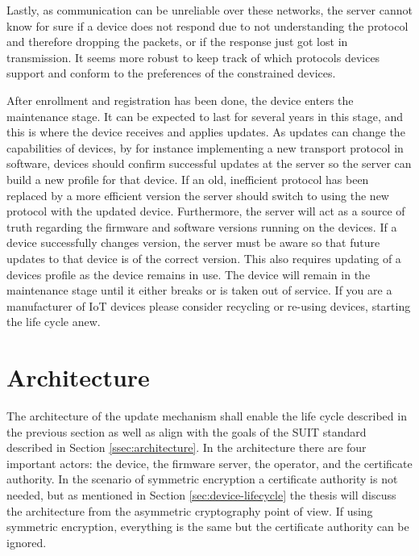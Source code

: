 \documentclass[0-thesis.tex]{subfiles}
\begin{document}
Lastly, as communication can be unreliable over these networks, the server cannot know for
sure if a device does not respond due to not understanding the protocol and therefore
dropping the packets, or if the response just got lost in transmission. It seems more
robust to keep track of which protocols devices support and conform to the preferences of
the constrained devices.

After enrollment and registration has been done, the device enters the maintenance stage.
It can be expected to last for several years in this stage, and this is where the device
receives and applies updates. As updates can change the capabilities of devices, by for
instance implementing a new transport protocol in software, devices should confirm
successful updates at the server so the server can build a new profile for that device. If
an old, inefficient protocol has been replaced by a more efficient version the server
should switch to using the new protocol with the updated device. Furthermore, the server
will act as a source of truth regarding the firmware and software versions running on the
devices. If a device successfully changes version, the server must be aware so that future
updates to that device is of the correct version. This also requires updating of a devices
profile as the device remains in use. The device will remain in the maintenance stage
until it either breaks or is taken out of service. If you are a manufacturer of IoT
devices please consider recycling or re-using devices, starting the life cycle anew.

\section{Architecture}
\label{sec:architecture}
The architecture of the update mechanism shall enable the life cycle described in the
previous section as well as align with the goals of the SUIT standard described in Section
\ref{ssec:architecture}. In the architecture there are four important actors: the device,
the firmware server, the operator, and the certificate authority. In the scenario of
symmetric encryption a certificate authority is not needed, but as mentioned in Section
\ref{sec:device-lifecycle} the thesis will discuss the architecture from the asymmetric
cryptography point of view. If using symmetric encryption, everything is the same but the
certificate authority can be ignored.
\end{document}
